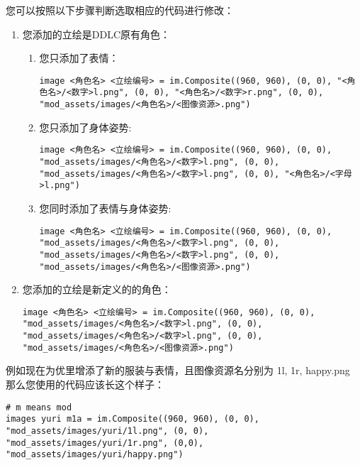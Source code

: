 您可以按照以下步骤判断选取相应的代码进行修改：
\begin{enumerate}
    \item 您添加的立绘是DDLC原有角色：
    \begin{enumerate}
        \item 您只添加了表情：
        \begin{lstlisting}[numbers=none]
image <角色名> <立绘编号> = im.Composite((960, 960), (0, 0), "<角色名>/<数字>l.png", (0, 0), "<角色名>/<数字>r.png", (0, 0), "mod_assets/images/<角色名>/<图像资源>.png") 
        \end{lstlisting}

        \item 您只添加了身体姿势:
        \begin{lstlisting}[numbers=none]
image <角色名> <立绘编号> = im.Composite((960, 960), (0, 0), "mod_assets/images/<角色名>/<数字>l.png", (0, 0), "mod_assets/images/<角色名>/<数字>l.png", (0, 0), "<角色名>/<字母>l.png") 
        \end{lstlisting}

        \item 您同时添加了表情与身体姿势:
        \begin{lstlisting}[numbers=none]
image <角色名> <立绘编号> = im.Composite((960, 960), (0, 0), "mod_assets/images/<角色名>/<数字>l.png", (0, 0), "mod_assets/images/<角色名>/<数字>l.png", (0, 0), "mod_assets/images/<角色名>/<图像资源>.png") 
        \end{lstlisting}
    \end{enumerate}

    \item 您添加的立绘是新定义的的角色：
    \begin{lstlisting}[numbers=none]
image <角色名> <立绘编号> = im.Composite((960, 960), (0, 0), "mod_assets/images/<角色名>/<数字>l.png", (0, 0), "mod_assets/images/<角色名>/<数字>l.png", (0, 0), "mod_assets/images/<角色名>/<图像资源>.png") 
    \end{lstlisting}
\end{enumerate}

例如现在为优里增添了新的服装与表情，且图像资源名分别为 1l, 1r, happy.png
那么您使用的代码应该长这个样子：
\begin{lstlisting}
# m means mod
images yuri m1a = im.Composite((960, 960), (0, 0), "mod_assets/images/yuri/1l.png", (0, 0), "mod_assets/images/yuri/1r.png", (0,0), "mod_assets/images/yuri/happy.png")
\end{lstlisting}



